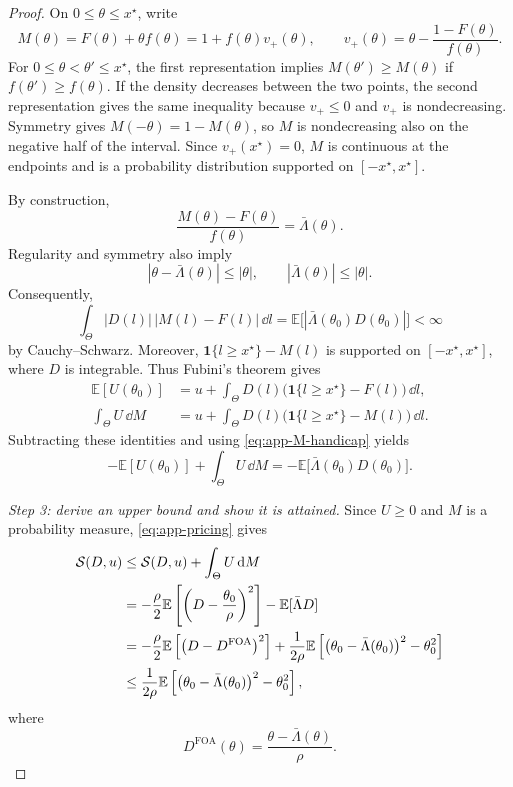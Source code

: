 \documentclass[12pt]{article}
\newcommand{\E}{\mathbb{E}}
\begin{document}
\begin{proof}
On \(0\leq\theta\leq x^\star\), write
\[
  M(\theta)=F(\theta)+\theta f(\theta)
  =1+f(\theta)v_+(\theta),
  \qquad
  v_+(\theta)=\theta-\frac{1-F(\theta)}{f(\theta)}.
\]
For \(0\leq\theta<\theta'\leq x^\star\), the first representation
implies \(M(\theta')\geq M(\theta)\) if
\(f(\theta')\geq f(\theta)\). If the density decreases between the two
points, the second representation gives the same inequality because
\(v_+\leq0\) and \(v_+\) is nondecreasing. Symmetry gives
\(M(-\theta)=1-M(\theta)\), so \(M\) is nondecreasing also on the
negative half of the interval. Since \(v_+(x^\star)=0\), \(M\) is
continuous at the endpoints and is a probability distribution supported
on \([-x^\star,x^\star]\).

By construction,
\begin{equation}\label{eq:app-M-handicap}
  \frac{M(\theta)-F(\theta)}{f(\theta)}
  =
  \bar\Lambda(\theta).
\end{equation}
Regularity and symmetry also imply
\begin{equation}\label{eq:app-vbounds}
  |\theta-\bar\Lambda(\theta)|\leq|\theta|,
  \qquad
  |\bar\Lambda(\theta)|\leq|\theta|.
\end{equation}
Consequently,
\[
  \int_\Theta
    |D(l)|\,|M(l)-F(l)|\,\dd l
  =
  \E\bigl[
    |\bar\Lambda(\theta_0)D(\theta_0)|
  \bigr]
  <\infty
\]
by Cauchy--Schwarz. Moreover,
\(\mathbf 1\{l\geq x^\star\}-M(l)\) is supported on
\([-x^\star,x^\star]\), where \(D\) is integrable. Thus Fubini's
theorem gives
\begin{align*}
  \E[U(\theta_0)]
  &=
  u+\int_\Theta D(l)
    \bigl(\mathbf 1\{l\geq x^\star\}-F(l)\bigr)\,\dd l,\\
  \int_\Theta U\,\dd M
  &=
  u+\int_\Theta D(l)
    \bigl(\mathbf 1\{l\geq x^\star\}-M(l)\bigr)\,\dd l.
\end{align*}
Subtracting these identities and using
\eqref{eq:app-M-handicap} yields
\begin{equation}\label{eq:app-pricing}
  -\E[U(\theta_0)]
  +\int_\Theta U\,\dd M
  =
  -\E\bigl[
    \bar\Lambda(\theta_0)D(\theta_0)
  \bigr].
\end{equation}

\emph{Step 3: derive an upper bound and show it is attained.}
Since \(U\geq0\) and \(M\) is a probability measure,
\eqref{eq:app-pricing} gives
\begin{align}
  \mathcal S(D,u)
  &\leq
  \mathcal S(D,u)+\int_\Theta U\,\dd M
  \notag\\
  &=
  -\frac{\rho}{2}\E\left[
    \left(D-\frac{\theta_0}{\rho}\right)^2
  \right]
  -\E[\bar\Lambda D]
  \notag\\
  &=
  -\frac{\rho}{2}\E\left[
    \left(D-D^{\mathrm{FOA}}\right)^2
  \right]
  +\frac{1}{2\rho}\E\left[
    \bigl(\theta_0-\bar\Lambda(\theta_0)\bigr)^2-\theta_0^2
  \right]
  \notag\\
  &\leq
  \frac{1}{2\rho}\E\left[
    \bigl(\theta_0-\bar\Lambda(\theta_0)\bigr)^2-\theta_0^2
  \right],
  \label{eq:app-duality}
\end{align}
where
\[
  D^{\mathrm{FOA}}(\theta)
  =
  \frac{\theta-\bar\Lambda(\theta)}{\rho}.
\]


\end{proof}
\end{document}
